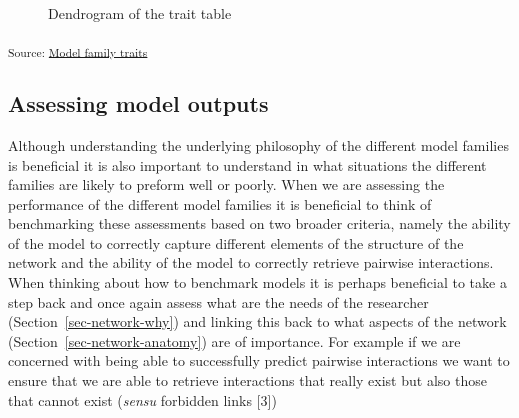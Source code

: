 \documentclass[
]{article}
\begin{document}
\begin{figure}[H]


\caption{\label{fig-dendo}Dendrogram of the trait table}

\end{figure}%

\textsubscript{Source:
\href{https://BecksLab.github.io/ms_t_is_for_topology/notebooks/model_qualitative-preview.html\#cell-fig-dendo}{Model
family traits}}

\subsection{Assessing model outputs}\label{assessing-model-outputs}

Although understanding the underlying philosophy of the different model
families is beneficial it is also important to understand in what
situations the different families are likely to preform well or poorly.
When we are assessing the performance of the different model families it
is beneficial to think of benchmarking these assessments based on two
broader criteria, namely the ability of the model to correctly capture
different elements of the structure of the network and the ability of
the model to correctly retrieve pairwise interactions. When thinking
about how to benchmark models it is perhaps beneficial to take a step
back and once again assess what are the needs of the researcher
(Section~\ref{sec-network-why}) and linking this back to what aspects of
the network (Section~\ref{sec-network-anatomy}) are of importance. For
example if we are concerned with being able to successfully predict
pairwise interactions we want to ensure that we are able to retrieve
interactions that really exist but also those that cannot exist
(\emph{sensu} forbidden links {[}3{]})
\end{document}
